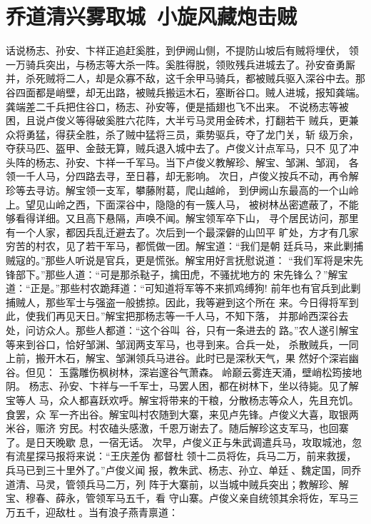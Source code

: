 \chapter{乔道清兴雾取城~小旋风藏炮击贼}

话说杨志、孙安、卞祥正追赶奚胜，到伊阙山侧，不提防山坡后有贼将埋伏，
领一万骑兵突出，与杨志等大杀一阵。奚胜得脱，领败残兵进城去了。孙安奋勇厮
并，杀死贼将二人，却是众寡不敌，这千余甲马骑兵，都被贼兵驱入深谷中去。那
谷四面都是峭壁，却无出路，被贼兵搬运木石，塞断谷口。贼人进城，报知龚端。
龚端差二千兵把住谷口，杨志、孙安等，便是插翅也飞不出来。
不说杨志等被困，且说卢俊义等得破奚胜六花阵，大半亏马灵用金砖术，打翻若干
贼兵，更兼众将勇猛，得获全胜，杀了贼中猛将三员，乘势驱兵，夺了龙门关，斩
级万余，夺获马匹、盔甲、金鼓无算，贼兵退入城中去了。卢俊义计点军马，只不
见了冲头阵的杨志、孙安、卞祥一千军马。当下卢俊义教解珍、解宝、邹渊、邹润，
各领一千人马，分四路去寻，至日暮，却无影响。
次日，卢俊义按兵不动，再令解珍等去寻访。解宝领一支军，攀藤附葛，爬山越岭，
到伊阙山东最高的一个山岭上。望见山岭之西，下面深谷中，隐隐的有一簇人马，
被树林丛密遮蔽了，不能够看得详细。又且高下悬隔，声唤不闻。解宝领军卒下山，
寻个居民访问，那里有一个人家，都因兵乱迁避去了。次后到一个最深僻的山凹平
旷处，方才有几家穷苦的村农，见了若干军马，都慌做一团。解宝道：“我们是朝
廷兵马，来此剿捕贼寇的。”那些人听说是官兵，更是慌张。解宝用好言抚慰说道：
“我们军将是宋先锋部下。”那些人道：“可是那杀鞑子，擒田虎，不骚扰地方的
宋先锋么？”解宝道：“正是。”那些村农跪拜道：“可知道将军等不来抓鸡缚狗!
前年也有官兵到此剿捕贼人，那些军士与强盗一般掳掠。因此，我等避到这个所在
来。今日得将军到此，使我们再见天日。”解宝把那杨志等一千人马，不知下落，
并那岭西深谷去处，问访众人。那些人都道：“这个谷叫谷，只有一条进去的
路。”农人遂引解宝等来到谷口，恰好邹渊、邹润两支军马，也寻到来。合兵一处，
杀散贼兵，一同上前，搬开木石，解宝、邹渊领兵马进谷。此时已是深秋天气，果
然好个深岩幽谷。但见：
玉露雕伤枫树林，深岩邃谷气萧森。
岭巅云雾连天涌，壁峭松筠接地阴。
杨志、孙安、卞祥与一千军士，马罢人困，都在树林下，坐以待毙。见了解宝等人
马，众人都喜跃欢呼。解宝将带来的干粮，分散杨志等众人，先且充饥。食罢，众
军一齐出谷。解宝叫村农随到大寨，来见卢先锋。卢俊义大喜，取银两米谷，赈济
穷民。村农磕头感激，千恩万谢去了。随后解珍这支军马，也回寨了。是日天晚歇
息，一宿无话。
次早，卢俊义正与朱武调遣兵马，攻取城池，忽有流星探马报将来说：“王庆差伪
都督杜领十二员将佐，兵马二万，前来救援，兵马已到三十里外了。”卢俊义闻
报，教朱武、杨志、孙立、单廷、魏定国，同乔道清、马灵，管领兵马二万，列
阵于大寨前，以当城中贼兵突出；教解珍、解宝、穆春、薛永，管领军马五千，看
守山寨。卢俊义亲自统领其余将佐，军马三万五千，迎敌杜。当有浪子燕青禀道：
